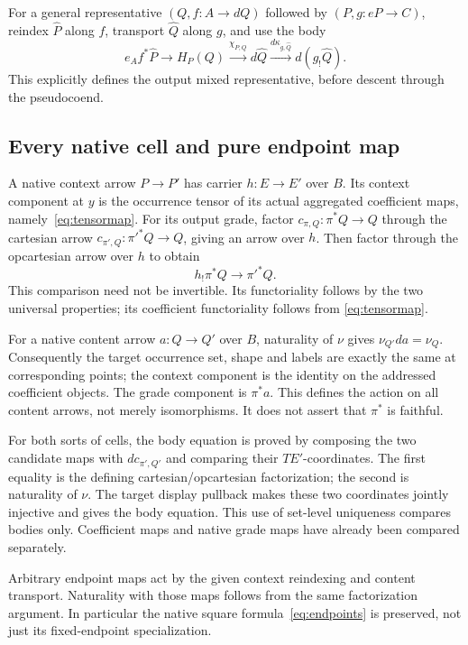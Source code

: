 \documentclass[11pt,a4paper]{article}
\theoremstyle{definition}
\begin{document}
For a general representative
$(Q,f:A\to dQ)$ followed by $(P,g:eP\to C)$, reindex $\widehat P$ along
$f$, transport $\widehat Q$ along $g$, and use the body
\[
 e_A f^*\widehat P\longrightarrow H_P(Q)
 \xrightarrow{\chi_{P,Q}}d\widehat Q
 \xrightarrow{d\kappa_{g,\widehat Q}}d(g_!\widehat Q).
\]
This explicitly defines the output mixed representative, before descent
through the pseudocoend.

\subsection{Every native cell and pure endpoint map}
A native context arrow $P\to P'$ has carrier $h:E\to E'$ over $B$.
Its context component at $y$ is the occurrence tensor
of its actual aggregated coefficient maps, namely~\eqref{eq:tensormap}.
For its output grade, factor $c_{\pi,Q}:\pi^*Q\to Q$ through the cartesian
arrow $c_{\pi',Q}:\pi'^*Q\to Q$, giving an arrow over $h$. Then factor
through the opcartesian arrow over $h$ to obtain
\begin{equation}\label{eq:hmap}
 h_!\pi^*Q\longrightarrow\pi'^*Q.
\end{equation}
This comparison need not be invertible. Its functoriality follows by the two
universal properties; its coefficient functoriality follows from
\eqref{eq:tensormap}.

For a native content arrow $a:Q\to Q'$ over $B$, naturality of $\nu$ gives
$\nu_{Q'}da=\nu_Q$. Consequently the target occurrence set, shape and labels
are exactly the same at corresponding points; the context component is the
identity on the addressed coefficient objects. The grade component is
$\pi^*a$. This defines the action on all content arrows, not merely
isomorphisms. It does not assert that $\pi^*$ is faithful.

For both sorts of cells, the body equation is proved by composing the two
candidate maps with $d c_{\pi',Q'}$ and comparing their $TE'$-coordinates.
The first equality is the defining cartesian/opcartesian factorization; the
second is naturality of $\nu$. The target display pullback makes these two
coordinates jointly injective and gives the body equation. This use of
set-level uniqueness compares bodies only. Coefficient maps and native grade
maps have already been compared separately.

Arbitrary endpoint maps act by the given context reindexing and content
transport. Naturality with those maps follows from the same factorization
argument. In particular the native square formula~\eqref{eq:endpoints} is
preserved, not just its fixed-endpoint specialization.
\end{document}
